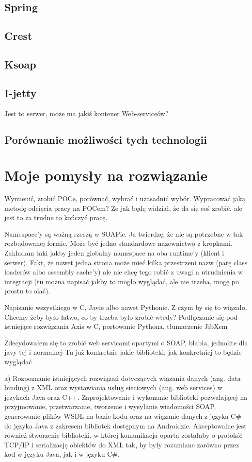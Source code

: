 \subsection{Spring}
\subsection{Crest}
\subsection{Ksoap}

\subsection{I-jetty}
Jest to serwer, może ma jakiś kontener Web-serviceów?

\subsection{Porównanie możliwości tych technologii}


\section{Moje pomysły na rozwiązanie}
Wymienić, zrobić POCe, porównać, wybrać i uzasadnić wybór. Wypracować jaką metodę odcięcia pracy na POCem? Że jak będę widział, że da się coś zrobić, ale jest to za trudne to kończyć pracę.

Namespace'y są ważną rzeczą w SOAPie. Ja twierdzę, że nie są potrzebne w tak rozbudowanej formie. Może być jedno standardowe nazewnictwo z kropkami. Zakładam taki jakby jeden globalny namespace na oba runtime'y (klient i serwer). Fakt, że nawet jedna strona może mieć kilka przestrzeni nazw (parę class loaderów albo assembly cache'y) ale nie chcę tego robić z uwagi n utrudnienia w integracji (tu można napisać jakby to mogło wyglądać, ale nie trzeba, mogę po prostu to olać).

Napisanie wszystkiego w C, Javie albo nawet Pythonie. Z czym by się to wiązało. Chcemy żeby było łatwo, co by trzeba było zrobić wtedy?
Podłączanie się pod istniejące rozwiązania Axis w C, portowanie Pythona, tłumaczenie JibXem

Zdecydowałem się to zrobić web servicami opartymi o SOAP, blabla, jednolite dla javy tej i normalnej
Tu już konkretnie jakie biblioteki, jak konkretniej to będzie wyglądać

a)	Rozpoznanie istniejących rozwiązań dotyczących wiązania danych (ang. data binding) z XML oraz wystawiania usług sieciowych (ang. web services) w językach Java oraz C++.
Zaprojektowanie i wykonanie biblioteki pozwalającej na przyjmowanie, przetwarzanie, tworzenie i wysyłanie wiadomości SOAP, generowanie plików WSDL na bazie kodu oraz na wiązanie danych z języka C\# do języka Java z zakresem bibliotek dostępnym na Androidzie. Akceptowalne jest również stworzenie biblioteki, w której komunikacja oparta zostałaby o protokół TCP/IP i serializację obiektów do XML tak, by były rozumiane zarówno przez kod w języku Java, jak i w języku C\#.

